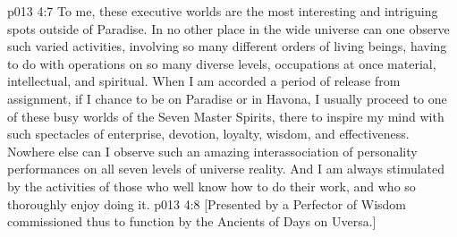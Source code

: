 \vs p013 4:7 To me, these executive worlds are the most interesting and intriguing spots outside of Paradise. In no other place in the wide universe can one observe such varied activities, involving so many different orders of living beings, having to do with operations on so many diverse levels, occupations at once material, intellectual, and spiritual. When I am accorded a period of release from assignment, if I chance to be on Paradise or in Havona, I usually proceed to one of these busy worlds of the Seven Master Spirits, there to inspire my mind with such spectacles of enterprise, devotion, loyalty, wisdom, and effectiveness. Nowhere else can I observe such an amazing interassociation of personality performances on all seven levels of universe reality. And I am always stimulated by the activities of those who well know how to do their work, and who so thoroughly enjoy doing it.
\vsetoff
\vs p013 4:8 [Presented by a Perfector of Wisdom commissioned thus to function by the Ancients of Days on Uversa.]
